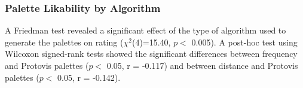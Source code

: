 \begin{center}
\end{center}

\subsubsection{Palette Likability by Algorithm} 
A Friedman test revealed a significant effect of the type of algorithm used to generate the palettes on rating ($\chi^2$(4)=15.40, $p <$ 0.005). A post-hoc test using Wilcoxon signed-rank tests showed the significant differences between frequency and Protovis palettes ($p <$ 0.05, r = -0.117) and between distance and Protovis palettes ($p <$ 0.05, r = -0.142).

